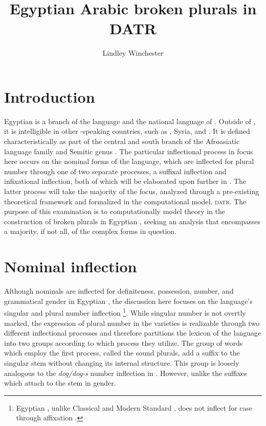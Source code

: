 \documentclass[output=paper,modfonts]{langscibook}
\title{Egyptian Arabic broken plurals in DATR}
\author{Lindley Winchester \affiliation{Georgetown University} 
}
\begin{document}
\maketitle
\section{Introduction} 

Egyptian  is a branch of the  language and the national language of . Outside of , it is intelligible in other -speaking countries, such as , Syria, and . It is defined characteristically as part of the central and south branch of the Afroasiatic language family and Semitic genus \citep{Lewis2009}. The particular inflectional process in focus here occurs on the nominal forms of the language, which are inflected for plural number through one of two separate processes, a suffixal inflection and infixational inflection, both of which will be elaborated upon further in . The latter process will take the majority of the focus, analyzed through a pre-existing theoretical framework and formalized in the computational model, \textsc{datr}. The purpose of this examination is to computationally model theory in the construction of broken plurals in Egyptian , seeking an analysis that encompasses a majority, if not all, of the complex forms in question.

\section{Nominal inflection}\label{sec:2:winchester}

Although nominals are inflected for definiteness, possession, number, and grammatical gender in Egyptian , the discussion here focuses on the language’s singular and plural number inflection \citep[129--130]{Gadalla2004}\footnote{ Egyptian , unlike Classical and Modern Standard , does not inflect for case through affixation \citep[108]{Gadalla2004}.}. While singular number is not overtly marked, the expression of plural number in the  varieties is realizable through two different inflectional processes and therefore partitions the lexicon of the language into two groups according to which process they utilize. The group of words which employ the first process, called the sound plurals, add a suffix to the singular stem without changing its internal structure. This group is loosely analogous to the \textit{dog/dog-s} number inflection in . However, unlike  the suffixes which attach to the stem  in gender. 
\end{document}
